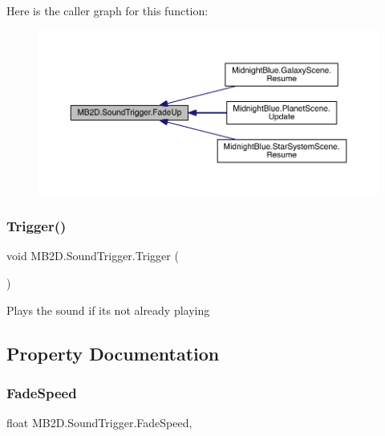 Here is the caller graph for this function\+:
\nopagebreak
\begin{figure}[H]
\begin{center}
\leavevmode
\includegraphics[width=350pt]{class_m_b2_d_1_1_sound_trigger_a677d10464891b21b44da3811430d5bea_icgraph}
\end{center}
\end{figure}
\hypertarget{class_m_b2_d_1_1_sound_trigger_a1387225550eb222ebbf70a8e097907a3}{}\label{class_m_b2_d_1_1_sound_trigger_a1387225550eb222ebbf70a8e097907a3} 
\subsubsection{\texorpdfstring{Trigger()}{Trigger()}}
{\footnotesize\ttfamily void M\+B2\+D.\+Sound\+Trigger.\+Trigger (\begin{DoxyParamCaption}{ }\end{DoxyParamCaption})\hspace{0.3cm}{\ttfamily [inline]}}



Plays the sound if it\textquotesingle{}s not already playing 



\subsection{Property Documentation}
\hypertarget{class_m_b2_d_1_1_sound_trigger_aff38429508a9f7d6d63e21ccb9605c16}{}\label{class_m_b2_d_1_1_sound_trigger_aff38429508a9f7d6d63e21ccb9605c16} 
\subsubsection{\texorpdfstring{Fade\+Speed}{FadeSpeed}}
{\footnotesize\ttfamily float M\+B2\+D.\+Sound\+Trigger.\+Fade\+Speed\hspace{0.3cm}{\ttfamily [get]}, {\ttfamily [set]}}



